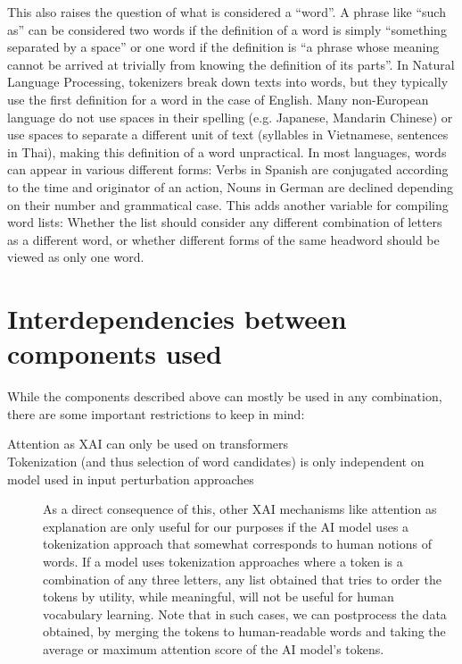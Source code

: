 \begin{description}
	      This also raises the question of what is considered a “word”.
	      A phrase like “such as” can be considered two words if the definition of a word is simply “something separated by a space” or one word if the definition is “a phrase whose meaning cannot be arrived at trivially from knowing the definition of its parts”.
	      In Natural Language Processing, tokenizers break down texts into words, but they typically use the first definition for a word in the case of English.
	      Many non-European language do not use spaces in their spelling (e.g. Japanese, Mandarin Chinese) or use spaces to separate a different unit of text (syllables in Vietnamese, sentences in Thai), making this definition of a word unpractical.
	      In most languages, words can appear in various different forms: Verbs in Spanish are conjugated according to the time and originator of an action, Nouns in German are declined depending on their number and grammatical case.
	      This adds another variable for compiling word lists: Whether the list should consider any different combination of letters as a different word, or whether different forms of the same headword should be viewed as only one word.
\end{description}


\section{Interdependencies between components used}

While the components described above can mostly be used in any combination, there are some important restrictions to keep in mind:

\begin{description}
	\item[Attention as XAI can only be used on transformers]
	\item[Tokenization (and thus selection of word candidates) is only independent on model used in input perturbation approaches]
	      As a direct consequence of this, other XAI mechanisms like attention as explanation are only useful for our purposes if the AI model uses a tokenization approach that somewhat corresponds to human notions of words.
	      If a model uses tokenization approaches where a token is a combination of any three letters, any list obtained that tries to order the tokens by utility, while meaningful, will not be useful for human vocabulary learning.
	      Note that in such cases, we can postprocess the data obtained, by merging the tokens to human-readable words and taking the average or maximum attention score of the AI model's tokens.
	\item[]
\end{description}


